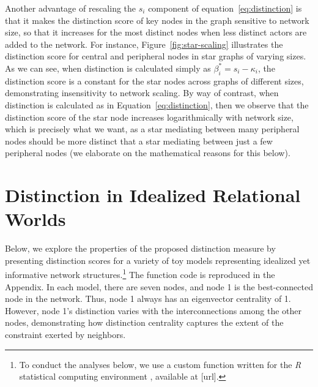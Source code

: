 \documentclass[12pt]{article}
\begin{document}
Another advantage of rescaling the $s_i$ component of equation~\ref{eq:distinction} is that it makes the distinction score of key nodes in the graph sensitive to network size, so that it increases for the most distinct nodes when less distinct actors are added to the network. For instance, Figure~\ref{fig:star-scaling} illustrates the distinction score for central and peripheral nodes in star graphs of varying sizes. As we can see, when distinction is calculated simply as $\beta^*_i = s_i - \kappa_i$, the distinction score is a constant for the star nodes across graphs of different sizes, demonstrating insensitivity to network scaling. By way of contrast, when distinction is calculated as in Equation~\ref{eq:distinction}, then we observe that the distinction score of the star node increases logarithmically with network size, which is precisely what we want, as a star mediating between many peripheral nodes should be more distinct that a star mediating between just a few peripheral nodes (we elaborate on the mathematical reasons for this below).  

\section{Distinction in Idealized Relational Worlds}
Below, we explore the properties of the proposed distinction measure by presenting distinction scores for a variety of toy models representing idealized yet informative network structures.\footnote{To conduct the analyses below, we use a custom function written for the \textit{R} statistical computing environment \citep{R}, available at [url].} The function code is reproduced in the Appendix. In each model, there are seven nodes, and node 1 is the best-connected node in the network. Thus, node 1 always has an eigenvector centrality of 1. However, node 1's distinction varies with the interconnections among the other nodes, demonstrating how distinction centrality captures the extent of the constraint exerted by neighbors.
\end{document}
